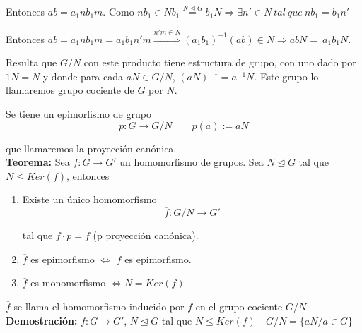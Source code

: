 \documentclass{article}
\begin{document}
Entonces $ab=a_1nb_1m$. Como $nb_1\in Nb_1 \overset{N\unlhd G}{=} b_1N\Rightarrow \exists n'\in N\:tal\:que\:nb_1=b_1n'$

Entonces $ab=a_1nb_1m=a_1b_1n'm \overset{n'm\in N}{\Rightarrow}(a_1b_1)^{-1}(ab)\in N\Rightarrow abN=~a_1b_1N$.

Resulta que $G/N$ con este producto tiene estructura de grupo, con uno dado por $1N=N$ y donde para cada $aN\in G/N$, $(aN)^{-1}=a^{-1}N$. Este grupo lo llamaremos grupo cociente de $G$ por $N$.

Se tiene un epimorfismo de grupo
\begin{equation*}
p:G\longrightarrow G/N\qquad p(a):=aN
\end{equation*}

que llamaremos la proyección canónica. \\

\textbf{Teorema:} Sea $f:G\rightarrow G'$ un homomorfismo de grupos. Sea $N\unlhd G$ tal que $N\leq Ker(f)$, entonces
\begin{enumerate}[(1)]
\item Existe un único homomorfismo
\begin{equation*}
\overline{f}:G/N\rightarrow G'
\end{equation*}

tal que $\overline{f}\cdot p=f$ (p proyección canónica).

\item $\overline{f}$ es epimorfismo $\Leftrightarrow$ $f$ es epimorfismo.

\item $\overline{f}$ es monomorfismo $\Leftrightarrow N=Ker(f)$
\end{enumerate}

$\overline{f}$ se llama el homomorfismo inducido por $f$ en el grupo cociente $G/N$ \\

\textbf{Demostración:} $f:G\rightarrow G'$, $N\unlhd G$ tal que $N\leq Ker(f) \quad G/N=\{aN/a\in G\}$ 
\end{document}
